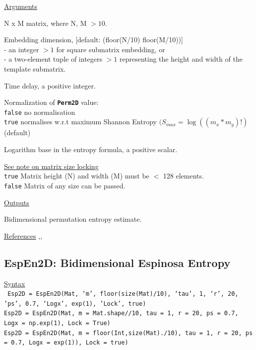 \documentclass[12pt, a4paper, titlepage, openany]{book}
\begin{document}
\noindent \ul{Arguments}
\begin{description}[labelsep=1cm, labelwidth=2cm, nosep,,style=multiline,leftmargin=3cm]\footnotesize
\item[\texttt{Mat}]		N x M matrix,  where N, M $> 10$.
\item[\texttt{m}]		Embedding dimension, [default: (floor(N/10) floor(M/10))]\\
						- an integer $> 1$ for square submatrix embedding, or\\
						- a two-element tuple of integers $> 1$ representing the height and width of the template submatrix.
\item[\texttt{tau}]		Time delay, a positive integer.
\item[\texttt{Norm}]	Normalization of \texttt{\textbf{Perm2D}} value:\\
		  \texttt{false} \hspace{10pt} no normalisation \\
		  \texttt{true} \hspace{15pt} normalises w.r.t maximum Shannon Entropy $(S_{max} = \log((m_x*m_y)!)$ (default)
\item[\texttt{Logx}]	Logarithm base in the entropy formula, a positive scalar.
\item[\texttt{Lock}]	\hyperlink{bidinote}{\ul{See note on matrix size locking}}\\
		  \texttt{true} \hspace{15pt} Matrix height (N) and width (M) must be $<$ 128 elements.\\
		  \texttt{false}\hspace{12pt} Matrix of any size can be passed.\\ 
\end{description}

\noindent \ul{Outputs}
\begin{description}[labelsep=1cm, labelwidth=2cm, nosep, style=multiline,leftmargin=3cm]\footnotesize
\item[\texttt{Perm2D}]		Bidimensional permutation entropy estimate.
\end{description}

\noindent \ul{References}\hspace{1cm}
\cite{Perm2D1},\cite{Perm2D2}, \cite{Matt1}



\newpage
\subsection{\normalsize EspEn2D: \hspace{15mm} Bidimensional Espinosa Entropy}
\noindent\ul{Syntax} \vspace{6mm} \\ \noindent \texttt{\footnotesize
Esp2D = EspEn2D(Mat, ‘m’, floor(size(Mat)/10), ‘tau’, 1, ‘r’, 20, 'ps', 0.7, ‘Logx’, exp(1), 'Lock', true)\\
Esp2D = EspEn2D(Mat, m = Mat.shape//10, tau = 1, r = 20, ps = 0.7, Logx = np.exp(1), Lock = True)\\
Esp2D = EspEn2D(Mat, m = floor(Int,size(Mat)./10), tau = 1, r = 20, ps = 0.7, Logx = exp(1)), Lock = true)}
\end{document}

